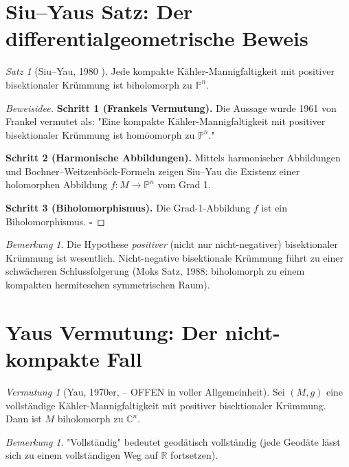 \documentclass[12pt,a4paper]{amsart}
\theoremstyle{definition}
\theoremstyle{remark}
\newtheorem{satz}[theorem]{Satz}
\newtheorem{vermutung}[theorem]{Vermutung}
\newtheorem{bemerkung}[theorem]{Bemerkung}
\newcommand{\CC}{\mathbb{C}}
\newcommand{\RR}{\mathbb{R}}
\newcommand{\PP}{\mathbb{P}}
\begin{document}
\section{Siu--Yaus Satz: Der differentialgeometrische Beweis}

\begin{satz}[Siu--Yau, 1980 \cite{SiuYau1980}]
\label{satz:siuyau}
Jede kompakte Kähler-Mannigfaltigkeit mit positiver bisektionaler Krümmung
ist biholomorph zu $\PP^n$.
\end{satz}

\begin{proof}[Beweisidee]
\textbf{Schritt 1 (Frankels Vermutung).}  Die Aussage wurde 1961 von Frankel
vermutet als: "Eine kompakte Kähler-Mannigfaltigkeit mit positiver bisektionaler
Krümmung ist homöomorph zu $\PP^n$."

\textbf{Schritt 2 (Harmonische Abbildungen).}  Mittels harmonischer Abbildungen
und Bochner--Weitzenböck-Formeln zeigen Siu--Yau die Existenz einer
holomorphen Abbildung $f \colon M \to \PP^n$ vom Grad 1.

\textbf{Schritt 3 (Biholomorphismus).}  Die Grad-1-Abbildung $f$ ist ein
Biholomorphismus. $\square$
\end{proof}

\begin{bemerkung}
Die Hypothese \emph{positiver} (nicht nur nicht-negativer) bisektionaler
Krümmung ist wesentlich.  Nicht-negative bisektionale Krümmung führt zu einer
schwächeren Schlussfolgerung (Moks Satz, 1988: biholomorph zu einem kompakten
hermiteschen symmetrischen Raum).
\end{bemerkung}

\section{Yaus Vermutung: Der nicht-kompakte Fall}

\begin{vermutung}[Yau, 1970er, \cite{Yau1977} -- OFFEN in voller Allgemeinheit]
\label{verm:yau}
Sei $(M, g)$ eine vollständige Kähler-Mannigfaltigkeit mit positiver
bisektionaler Krümmung.  Dann ist $M$ biholomorph zu $\CC^n$.
\end{vermutung}

\begin{bemerkung}
"Vollständig" bedeutet geodätisch vollständig (jede Geodäte lässt sich
zu einem vollständigen Weg auf $\RR$ fortsetzen).
\end{bemerkung}
\end{document}
